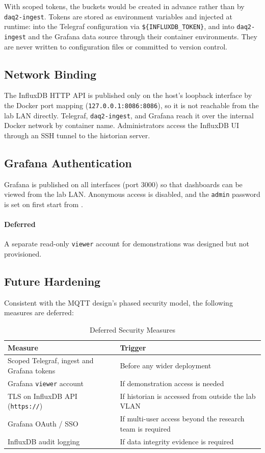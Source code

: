 With scoped tokens, the buckets would be created in advance rather than by \texttt{daq2-ingest}. Tokens are stored as environment variables and injected at runtime: into the Telegraf configuration via \texttt{\$\{INFLUXDB\_TOKEN\}}, and into \texttt{daq2-ingest} and the Grafana data source through their container environments. They are never written to configuration files or committed to version control.

\subsection{Network Binding}
The InfluxDB HTTP API is published only on the host's loopback interface by the Docker port mapping (\texttt{127.0.0.1:8086:8086}), so it is not reachable from the lab LAN directly. Telegraf, \texttt{daq2-ingest}, and Grafana reach it over the internal Docker network by container name. Administrators access the InfluxDB UI through an SSH tunnel to the historian server.

\subsection{Grafana Authentication}
Grafana is published on all interfaces (port 3000) so that dashboards can be viewed from the lab LAN. Anonymous access is disabled, and the \texttt{admin} password is set on first start from .

\paragraph{Deferred} A separate read-only \texttt{viewer} account for demonstrations was designed but not provisioned.

\subsection{Future Hardening}
Consistent with the MQTT design's phased security model, the following measures are deferred:
\begin{table}[H]
\centering
\caption{Deferred Security Measures}
\begin{tabular}{ll}
\hline
\textbf{Measure} & \textbf{Trigger} \\
\hline
Scoped Telegraf, ingest and Grafana tokens & Before any wider deployment \\
Grafana \texttt{viewer} account           & If demonstration access is needed \\
TLS on InfluxDB API (\texttt{https://})   & If historian is accessed from outside the lab VLAN \\
Grafana OAuth / SSO                       & If multi-user access beyond the research team is required \\
InfluxDB audit logging                    & If data integrity evidence is required \\
\hline
\end{tabular}
\end{table}
